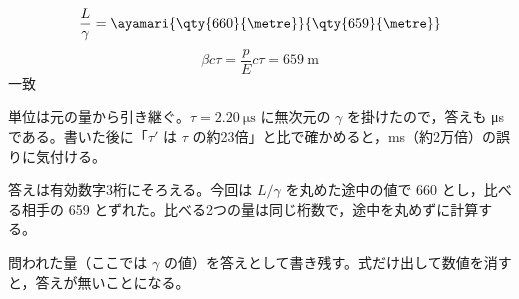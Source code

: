 \[ \frac{L}{\gamma}=\ayamari{\qty{660}{\metre}}{\qty{659}{\metre}} \]
\[ \beta c\tau=\frac{p}{E}c\tau=\qty{659}{\metre} \]
一致
\item 単位は元の量から引き継ぐ。$\tau=\qty{2.20}{\micro\second}$ に無次元の $\gamma$ を掛けたので，答えも \unit{\micro\second} である。書いた後に「$\tau'$ は $\tau$ の約23倍」と比で確かめると，\unit{\milli\second}（約2万倍）の誤りに気付ける。
\item {} 答えは有効数字3桁にそろえる。今回は $L/\gamma$ を丸めた途中の値で 660 とし，比べる相手の 659 とずれた。比べる2つの量は同じ桁数で，途中を丸めずに計算する。
\item {} 問われた量（ここでは $\gamma$ の値）を答えとして書き残す。式だけ出して数値を消すと，答えが無いことになる。
